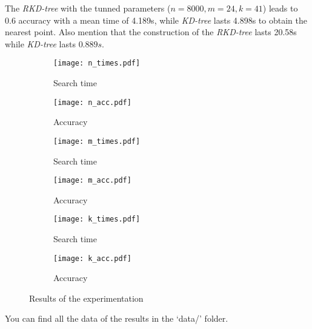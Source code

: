 The \textit{RKD-tree} with the tunned parameters ($n = 8000, m = 24, k = 41$) leads to 0.6 accuracy with a mean time of 4.189s, while \textit{KD-tree} lasts 4.898s to obtain the nearest point. Also mention that the construction of the \textit{RKD-tree} lasts 20.58s while \textit{KD-tree} lasts $0.889s$.

\begin{figure*}[hbtp]
    \begin{subfigure}[b]{0.45\textwidth}
          \texttt{[image: n\_times.pdf]}
          \caption{Search time}
          \label{fig:n_times}
    \end{subfigure}
    \hspace{0.05\textwidth}
    \begin{subfigure}[b]{0.45\textwidth}
          \texttt{[image: n\_acc.pdf]}
          \caption{Accuracy}
          \label{fig:n_acc}
    \end{subfigure}
    \begin{subfigure}[b]{0.45\textwidth}
          \texttt{[image: m\_times.pdf]}
          \caption{Search time}
          \label{fig:m_times}
    \end{subfigure}
    \hspace{0.05\textwidth}
    \begin{subfigure}[b]{0.45\textwidth}
          \texttt{[image: m\_acc.pdf]}
          \caption{Accuracy}
          \label{fig:m_acc}
    \end{subfigure}
    \begin{subfigure}[b]{0.45\textwidth}
          \texttt{[image: k\_times.pdf]}
          \caption{Search time}
          \label{fig:hv_times}
    \end{subfigure}
    \hspace{0.05\textwidth}
    \begin{subfigure}[b]{0.45\textwidth}
          \texttt{[image: k\_acc.pdf]}
          \caption{Accuracy}
          \label{fig:hv_acc}
    \end{subfigure}
    \caption{Results of the experimentation}
    \label{fig:experiment}
\end{figure*}

You can find all the data of the results in the `data/' folder.

